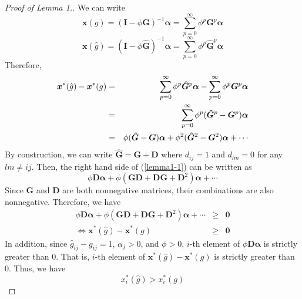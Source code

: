 \documentclass[12pt]{article}
\theoremstyle{definition}
\begin{document}
\begin{proof}[Proof of Lemma 1.]
	We can write
	\[ \bm{x}(g) = {(\bm{I} - \phi \bm{G})}^{-1} \bm{\alpha} = \sum_{p=0}^{\infty} \phi^p \bm{G}^p \bm{\alpha} \]
	\[ \bm{x}(\hat{g}) = {(\bm{I} - \phi \bm{\hat{G}})}^{-1} \bm{\alpha} = \sum_{p=0}^{\infty} \phi^p \bm{\hat{G}}^p \bm{\alpha} \]
	Therefore,
	\begin{eqnarray}
		\label{lemma1-1}
		\bm{x}^*(\hat{g}) - \bm{x}^*(g) &=& \sum_{p=0}^{\infty} \phi^p \bm{\hat{G}}^p \bm{\alpha} - \sum_{p=0}^{\infty} \phi^p \bm{G}^p \bm{\alpha} \notag \\
										&=& \sum_{p=0}^{\infty} \phi^p (\bm{\hat{G}}^p - \bm{G}^p) \bm{\alpha} \notag \\
										&=& \phi (\bm{\hat{G}} - \bm{G}) \bm{\alpha} + \phi^2 (\bm{\hat{G}}^2 - \bm{G}^2) \bm{\alpha} + \cdots
	\end{eqnarray}
	By construction, we can write $\bm{\hat{G}} = \bm{G} + \bm{D}$ where $d_{ij} = 1$ and $d_{lm} = 0$ for any $lm \neq ij$.
	Then, the right hand side of (\ref{lemma1-1}) can be written as
	\[ \phi \bm{D} \bm{\alpha} + \phi (\bm{G} \bm{D} + \bm{D} \bm{G} + \bm{D}^2) \bm{\alpha} + \cdots \]
	Since $\bm{G}$ and $\bm{D}$ are both nonnegative matrices, their combinations are also nonnegative.
	Therefore, we have
	\begin{eqnarray*}
		\phi \bm{D} \bm{\alpha} + \phi (\bm{G} \bm{D} + \bm{D} \bm{G} + \bm{D}^2) \bm{\alpha} + \cdots &\ge& \bm{0} \\
		\Leftrightarrow \bm{x}^*(\hat{g}) - \bm{x}^*(g) &\ge& \bm{0}
	\end{eqnarray*}
	In addition, since $\hat{g}_{ij} - g_{ij} = 1$, $\alpha_j > 0$, and $\phi > 0$, $i$-th element of $\phi \bm{D} \bm{\alpha}$ is strictly greater than $0$.
	That is, $i$-th element of $\bm{x}^*(\hat{g}) - \bm{x}^*(g)$ is strictly greater than $0$.
	Thus, we have
	\[ x_i^*(\hat{g}) > x_i^*(g) \]
\end{proof}
\end{document}
